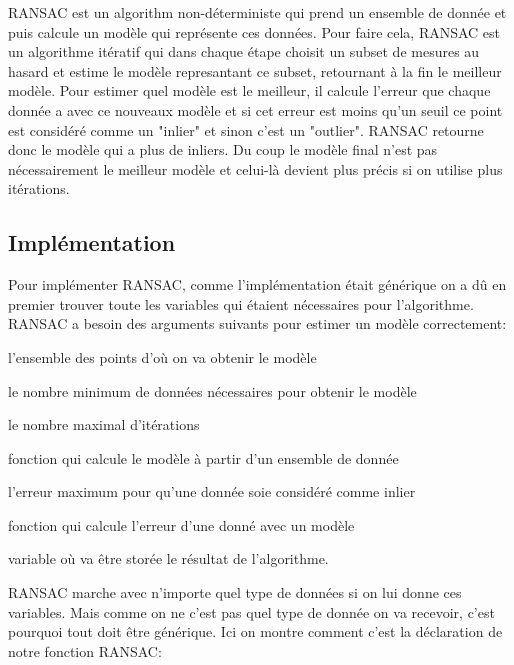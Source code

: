 \documentclass[11pt]{article}
\begin{document}
RANSAC est un algorithm non-déterministe qui prend un ensemble de donnée et puis calcule un modèle qui représente ces données. Pour faire cela, RANSAC est un algorithme itératif qui dans chaque étape choisit un subset de mesures au hasard et estime le modèle represantant ce subset, retournant à la fin le meilleur modèle. Pour estimer quel modèle est le meilleur, il calcule l’erreur que chaque donnée a avec ce nouveaux modèle et si cet erreur est moins qu’un seuil ce point est considéré comme un "inlier" et sinon c’est un "outlier". RANSAC retourne donc le modèle qui a plus de inliers.  Du coup le modèle final n’est pas nécessairement le meilleur modèle et celui-là devient plus précis si on utilise plus itérations. 

\subsection{Implémentation}

Pour implémenter RANSAC, comme l'implémentation était générique on a dû en premier trouver toute les variables qui étaient nécessaires pour l’algorithme. \\
RANSAC a besoin des arguments suivants pour estimer un modèle correctement:
\begin{description}[labelindent=16pt,style=multiline,leftmargin=7cm, noitemsep]
	\item[data:] l’ensemble des points d’où on va obtenir le modèle
	\item[minNumberOfDataPoints:] le nombre minimum de données nécessaires pour obtenir le modèle
	\item[maxNumberOfIterations:] le nombre maximal d’itérations
	\item[calculateParameters:] fonction qui calcule le modèle à partir d’un ensemble de donnée
	\item[errorThreshold:] l’erreur maximum pour qu’une donnée soie considéré comme inlier
	\item[calculateError:] fonction qui calcule l’erreur d’une donné avec un modèle
	\item[bestFittingParameters:] variable où va être storée le résultat de l'algorithme.
\end{description}

\pagebreak

RANSAC marche avec n’importe quel type de données si on lui donne ces variables. Mais comme on ne c’est pas quel type de donnée on va recevoir, c’est pourquoi tout doit être générique. Ici on montre comment c’est la déclaration de notre fonction RANSAC:
\end{document}

